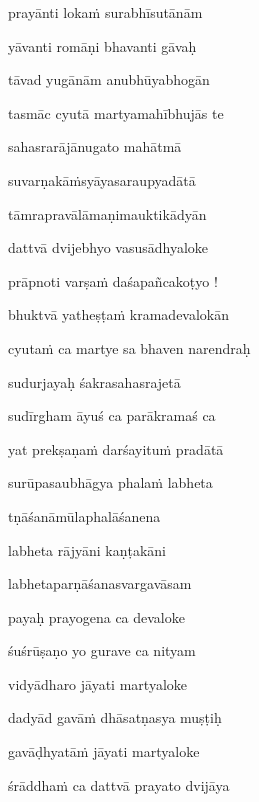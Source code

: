 \nemslokad 
prayānti loka\.m surabhīsutānām \veg\dontdisplaylinenum

\ujvers\nemsloka 
yāvanti romāṇi bhavanti gāvaḥ
\dontdisplaylinenum

\nemslokab 
tāvad yugānām anubhūyabhogān \danda\dontdisplaylinenum

\nemslokac 
tasmāc cyutā martyamahībhujās te
\dontdisplaylinenum

\nemslokad 
sahasrarājānugato mahātmā \veg\dontdisplaylinenum

\ujvers\nemsloka 
suvarṇakā\.msyāyasaraupyadātā
\dontdisplaylinenum

\nemslokab 
tāmrapravālāmaṇimauktikādyān \danda\dontdisplaylinenum

\nemslokac 
dattvā dvijebhyo vasusādhyaloke
\dontdisplaylinenum

\nemslokad 
prāpnoti varṣa\.m daśapañcakoṭyo !  \veg\dontdisplaylinenum

\ujvers\nemsloka 
bhuktvā yatheṣṭa\.m kramadevalokān
\dontdisplaylinenum

\nemslokab 
cyuta\.m ca martye sa bhaven narendraḥ \danda\dontdisplaylinenum

\nemslokac 
sudurjayaḥ śakrasahasrajetā
\dontdisplaylinenum

\nemslokad 
sudīrgham āyuś ca parākramaś ca \veg\dontdisplaylinenum

\ujvers\nemsloka 
yat prekṣaṇa\.m darśayitu\.m pradātā
\dontdisplaylinenum

\nemslokab 
surūpasaubhāgya phala\.m labheta \danda\dontdisplaylinenum

\nemslokac 
tṇāśanāmūlaphalāśanena
\dontdisplaylinenum

\nemslokad 
labheta rājyāni kaṇṭakāni \veg\dontdisplaylinenum

\ujvers\nemsloka 
labhetaparṇāśanasvargavāsam
\dontdisplaylinenum

\nemslokab 
payaḥ prayogena ca devaloke \danda\dontdisplaylinenum

\nemslokac 
śuśrūṣaṇo yo gurave ca nityam
\dontdisplaylinenum

\nemslokad 
vidyādharo jāyati martyaloke \veg\dontdisplaylinenum

\ujvers\nemsloka 
dadyād gavā\.m dhāsatṇasya muṣṭiḥ
\dontdisplaylinenum

\nemslokab 
gavāḍhyatā\.m jāyati martyaloke \danda\dontdisplaylinenum

\nemslokac 
śrāddha\.m ca dattvā prayato dvijāya
\dontdisplaylinenum

